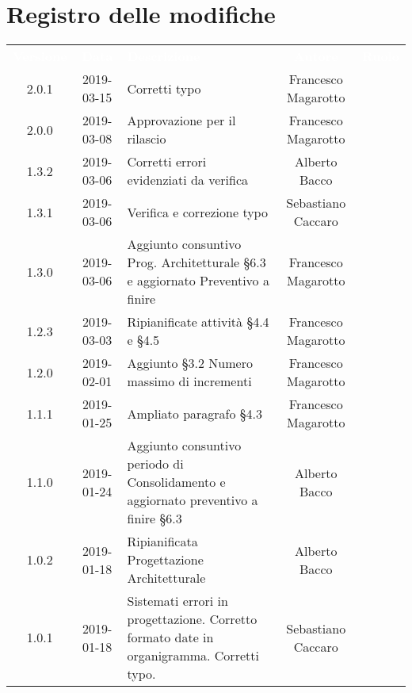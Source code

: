 \section*{Registro delle modifiche}
{
	\renewcommand{\arraystretch}{1.5}
	\centering
	\begin{longtable}{ c c  C{4cm}  c  c }
		
		\textcolor{white}{\textbf{Versione}} & \textcolor{white}{\textbf{Data}} & \textcolor{white}{\textbf{Descrizione}} & \textcolor{white}{\textbf{Autore}} & \textcolor{white}{\textbf{Ruolo}}\\
		2.0.1 & 2019-03-15 & Corretti typo & Francesco Magarotto & \reda{}\\
		2.0.0 & 2019-03-08 & Approvazione per il rilascio & Francesco Magarotto & \Res{}\\
		
		1.3.2 & 2019-03-06 & Corretti errori evidenziati da verifica & Alberto Bacco & \reda{}\\
		
		1.3.1 & 2019-03-06 & Verifica e correzione typo & Sebastiano Caccaro & \ver{}\\

		1.3.0 & 2019-03-06 & Aggiunto consuntivo Prog. Architetturale §6.3 e aggiornato Preventivo a finire & Francesco Magarotto & \reda{}\\

		1.2.3 & 2019-03-03 & Ripianificate attività §4.4 e §4.5 & Francesco Magarotto & \reda{}\\

		1.2.0 & 2019-02-01 & Aggiunto §3.2 Numero massimo di incrementi & Francesco Magarotto & \reda{}\\

		1.1.1 & 2019-01-25 & Ampliato paragrafo §4.3 & Francesco Magarotto & \reda{}\\

		1.1.0 & 2019-01-24 & Aggiunto consuntivo periodo di Consolidamento  e aggiornato preventivo a finire §6.3 & Alberto Bacco & \reda{}\\

		1.0.2 & 2019-01-18 & Ripianificata Progettazione Architetturale & Alberto Bacco & \Res{} \\

		1.0.1 & 2019-01-18 & Sistemati errori in progettazione. Corretto formato date in organigramma. Corretti typo. & Sebastiano Caccaro & \reda{}\\


\end{longtable}}
